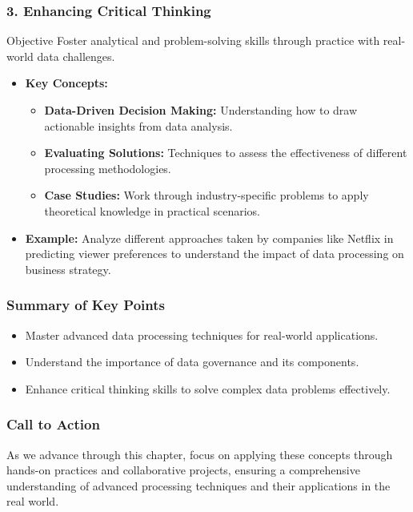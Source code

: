 \documentclass[aspectratio=169]{beamer}
\begin{document}
\begin{frame}[fragile]
    \frametitle{3. Enhancing Critical Thinking}
    \begin{block}{Objective}
        Foster analytical and problem-solving skills through practice with real-world data challenges.
    \end{block}
    \begin{itemize}
        \item \textbf{Key Concepts:}
        \begin{itemize}
            \item \textbf{Data-Driven Decision Making:} Understanding how to draw actionable insights from data analysis.
            \item \textbf{Evaluating Solutions:} Techniques to assess the effectiveness of different processing methodologies.
            \item \textbf{Case Studies:} Work through industry-specific problems to apply theoretical knowledge in practical scenarios.
        \end{itemize}

        \item \textbf{Example:}
        Analyze different approaches taken by companies like Netflix in predicting viewer preferences to understand the impact of data processing on business strategy.
    \end{itemize}
\end{frame}

\begin{frame}[fragile]
    \frametitle{Summary of Key Points}
    \begin{itemize}
        \item Master advanced data processing techniques for real-world applications.
        \item Understand the importance of data governance and its components.
        \item Enhance critical thinking skills to solve complex data problems effectively.
    \end{itemize}
\end{frame}

\begin{frame}[fragile]
    \frametitle{Call to Action}
    As we advance through this chapter, focus on applying these concepts through hands-on practices and collaborative projects, ensuring a comprehensive understanding of advanced processing techniques and their applications in the real world.
\end{frame}
\end{document}
